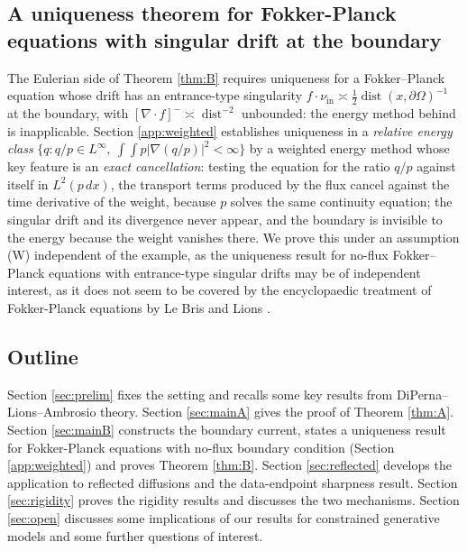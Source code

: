 \documentclass[11pt]{amsart}
\theoremstyle{definition}
\newcommand{\dive}{\nabla\!\cdot}
\newcommand{\dd}{\,d}
\begin{document}
\subsection{A uniqueness theorem for Fokker-Planck equations with singular drift at the boundary}

The Eulerian side of Theorem \ref{thm:B} requires uniqueness for a
Fokker--Planck equation whose drift has an entrance-type singularity
$f\cdot\nu_{\mathrm{in}} \asymp \tfrac12\operatorname{dist}(x,
\partial\Omega)^{-1}$ at the boundary, with $[\dive f]^- \asymp
\operatorname{dist}^{-2}$ unbounded: the energy method behind
\cite[Theorem~3.1]{pfode} is inapplicable. Section
\ref{app:weighted} establishes uniqueness in a \emph{relative energy
class} $\{q : q/p \in L^\infty,\ \int\!\!\int p|\nabla(q/p)|^2 <
\infty\}$ by a weighted energy method whose key feature is an
\emph{exact cancellation}: testing the equation for the ratio $q/p$
against itself in $L^2(p\dd x)$, the transport terms produced by the
flux cancel against the time derivative of the weight, because $p$
solves the same continuity equation; the singular drift and its
divergence never appear, and the boundary is invisible to the energy
because the weight vanishes there. We  prove this under an
assumption (W) independent of the example, as
the uniqueness result  for no-flux Fokker--Planck equations with
entrance-type singular drifts may be of independent interest, as it does not seem to be covered by the encyclopaedic treatment of Fokker-Planck equations by Le Bris and Lions \cite{LBL2019}.

\subsection{Outline}
Section \ref{sec:prelim} fixes the setting and recalls some key results from
DiPerna--Lions--Ambrosio theory. Section \ref{sec:mainA} gives the proof of 
Theorem \ref{thm:A}. Section \ref{sec:mainB} constructs the boundary
current, states a uniqueness result for Fokker-Planck equations with no-flux boundary condition (Section \ref{app:weighted}) and proves Theorem \ref{thm:B}. Section \ref{sec:reflected}
develops the application to reflected diffusions  and the data-endpoint
sharpness result. Section \ref{sec:rigidity} proves the rigidity
results and discusses the two mechanisms. Section \ref{sec:open}
discusses some implications of our results for constrained generative models and  some further questions of interest. 

\end{document}
